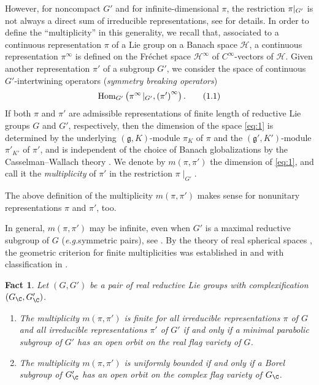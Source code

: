 \documentclass[10pt]{article} %
\newcommand{\Hom}{\mbox{\normalfont Hom}}
\newtheorem{fact}{Fact}
\theoremstyle{definition}
\begin{document}
However, 
for noncompact $G'$ and for infinite-dimensional $\pi$,
the restriction $\pi\kern-0.1cm\mid_{G'}$
is not always a direct sum of irreducible representations, see \cite{kobayashi1998discrete3} for details.
In order to define the ``multiplicity'' in this generality, we recall that, associated to a continuous representation $\pi$ of a Lie group on a Banach space $\mathcal{H}$, 
a continuous representation $\pi^\infty$ is defined on the Fr\'echet space $\mathcal{H}^\infty$ of $C^\infty$-vectors of $\mathcal{H}$.
Given another representation $\pi'$ of a subgroup $G'$, we consider the space of continuous $G'$-intertwining operators ({\it symmetry breaking operators})
\begin{equation}\label{eq:1}
	\Hom_{G'}\left( \pi^\infty\!\mid_{G'}, \left( \pi' \right)^\infty\right).\tag{1.1}
\end{equation}
If both $\pi$ and $\pi'$ are admissible representations of finite length of reductive Lie groups $G$ and $G'$, respectively, then the dimension of the space \eqref{eq:1} is determined by the underlying
$(\mathfrak{g},K)$-module $\pi_K$ of $\pi$ and the $(\mathfrak{g}',K')$-module $\pi'_{K'}$ of $\pi'$, and is independent of the choice of Banach globalizations by the 
Casselman--Wallach theory
\cite[Chap.\ 11]{wallach1988real2}. We denote by $m(\pi,\pi')$ the dimension of \eqref{eq:1}, and call it the {\it multiplicity} of $\pi'$ in the restriction $\pi\!\mid_{G'}$.

The above definition of the multiplicity $m(\pi,\pi')$ makes sense for nonunitary representations $\pi$ and $\pi'$, too. 

In general, $m(\pi,\pi')$ may be infinite, even when $G'$ is a 
maximal reductive subgroup of $G$
({\it e.g.}\;symmetric pairs), see \cite{Kobayashi2014}.
By the theory of real spherical spaces \cite{kobayashi2013finite}, the geometric criterion for finite multiplicities was established in \cite{Kobayashi2014} and \cite{kobayashi2013finite} with classification in \cite{kobayashi2014classification}.
\begin{fact}\label{fact:1} Let $(G,G')$ be a pair of real reductive Lie groups with complexification $(G_{\C},G'_{\C})$.
	\begin{enumerate}[(1)]
		\item The multiplicity $m(\pi,\pi')$ is finite for all irreducible representations $\pi$ of $G$ and all irreducible representations $\pi'$ of $G'$ if and only if
			a minimal parabolic subgroup of $G'$ has an open orbit on the real flag variety of $G$.
		\item The multiplicity $m(\pi,\pi')$ is uniformly bounded if and only if a Borel subgroup of $G_{\C}'$ has an open orbit on the complex flag variety of $G_{\C}$.
	\end{enumerate}
\end{fact}
\end{document}
